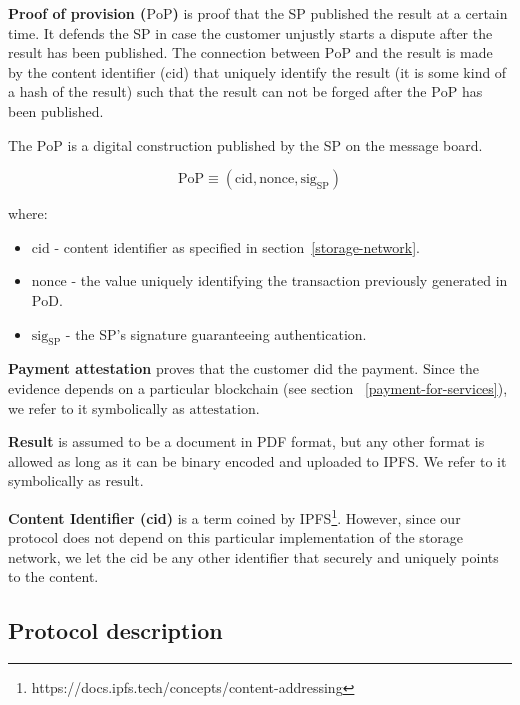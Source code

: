 \documentclass{ieeeaccess}
\begin{document}
\noindent \textbf
{Proof of provision ($\mathrm{PoP}$)}\label{proof-of-provision} is proof that the SP published the result at a certain time. It defends the SP in case the customer unjustly starts a dispute after the result has been published. The connection between $\mathrm{PoP}$ and the result is made by the content identifier ($\mathrm{cid}$) that uniquely identify the result (it is some kind of a hash of the result) such that the result can not be forged after the $\mathrm{PoP}$ has been published.

The $\mathrm{PoP}$ is a digital construction published by the SP on the message board.

\[\mathrm{PoP} \equiv (\mathrm{cid}, \mathrm{nonce}, \mathrm{sig}_\mathrm{SP})\]

where:

\begin{itemize}

\item
  \(\mathrm{cid}\) - content identifier as specified in section~\ref{storage-network}.
\item
  \(\mathrm{nonce}\) - the value uniquely identifying the transaction previously generated in $\mathrm{PoD}$.
\item
  \(\mathrm{sig}_\mathrm{SP}\) - the SP's signature guaranteeing authentication.
\end{itemize}

\noindent \textbf
{Payment attestation}\label{payment-attestation} proves that the customer did the payment. Since the evidence depends on a particular blockchain (see section ~\ref{payment-for-services}), we refer to it symbolically as
\(\mathrm{attestation}\).

\noindent \textbf
{Result}\label{results} is assumed to be a document in PDF format, but any other format is allowed as long as it can be binary encoded and uploaded to IPFS. We refer to it symbolically as $\mathrm{result}$.

\noindent \textbf
{Content Identifier (cid)}\label{content-identifier-cid} is a term coined by IPFS\footnote{https://docs.ipfs.tech/concepts/content-addressing}. However, since our protocol does not depend on
this particular implementation of the storage network, we let the $\mathrm{cid}$ be any other identifier that securely and uniquely points to the content.

\subsection{Protocol description}\label{protocol-description}
\end{document}
